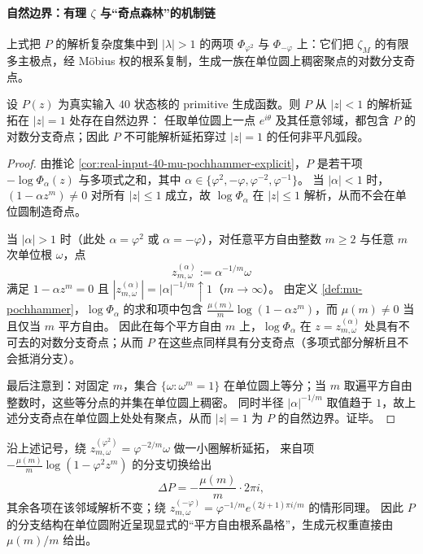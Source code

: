 \paragraph{自然边界：有理 \texorpdfstring{$\zeta$}{zeta} 与“奇点森林”的机制链}
上式把 \(P\) 的解析复杂度集中到 \(|\lambda|>1\) 的两项 \(\Phi_{\varphi^2}\) 与 \(\Phi_{-\varphi}\) 上：它们把 \(\zeta_M\) 的有限多主极点，经 Möbius 权的根系复制，生成一族在单位圆上稠密聚点的对数分支奇点。

\begin{theorem}[单位圆自然边界]\label{thm:primitive-natural-boundary-unit-circle}
设 \(P(z)\) 为真实输入 \(40\) 状态核的 primitive 生成函数。则 \(P\) 从 \(|z|<1\) 的解析延拓在 \(|z|=1\) 处存在自然边界：
任取单位圆上一点 \(e^{i\theta}\) 及其任意邻域，都包含 \(P\) 的对数分支奇点；因此 \(P\) 不可能解析延拓穿过 \(|z|=1\) 的任何非平凡弧段。
\end{theorem}
\begin{proof}
由推论 \ref{cor:real-input-40-mu-pochhammer-explicit}，\(P\) 是若干项 \(-\log\Phi_\alpha(z)\) 与多项式之和，其中 \(\alpha\in\{\varphi^2,-\varphi,\varphi^{-2},\varphi^{-1}\}\)。
当 \(|\alpha|<1\) 时，\((1-\alpha z^m)\neq 0\) 对所有 \(|z|\le 1\) 成立，故 \(\log\Phi_\alpha\) 在 \(|z|\le 1\) 解析，从而不会在单位圆制造奇点。

当 \(|\alpha|>1\) 时（此处 \(\alpha=\varphi^2\) 或 \(\alpha=-\varphi\)），对任意平方自由整数 \(m\ge 2\) 与任意 \(m\) 次单位根 \(\omega\)，点
\[
z_{m,\omega}^{(\alpha)}:=\alpha^{-1/m}\omega
\]
满足 \(1-\alpha z^m=0\) 且 \(|z_{m,\omega}^{(\alpha)}|=|\alpha|^{-1/m}\uparrow 1\)（\(m\to\infty\)）。
由定义 \ref{def:mu-pochhammer}，\(\log\Phi_\alpha\) 的求和项中包含
\(\frac{\mu(m)}{m}\log(1-\alpha z^m)\)，而 \(\mu(m)\neq 0\) 当且仅当 \(m\) 平方自由。
因此在每个平方自由 \(m\) 上，\(\log\Phi_\alpha\) 在 \(z=z_{m,\omega}^{(\alpha)}\) 处具有不可去的对数分支奇点；从而 \(P\) 在这些点同样具有分支奇点（多项式部分解析且不会抵消分支）。

最后注意到：对固定 \(m\)，集合 \(\{\omega:\omega^m=1\}\) 在单位圆上等分；当 \(m\) 取遍平方自由整数时，这些等分点的并集在单位圆上稠密。
同时半径 \(|\alpha|^{-1/m}\) 取值趋于 \(1\)，故上述分支奇点在单位圆上处处有聚点，从而 \(|z|=1\) 为 \(P\) 的自然边界。证毕。
\end{proof}

\begin{remark}\label{rem:primitive-monodromy-mu}
沿上述记号，绕 \(z_{m,\omega}^{(\varphi^2)}=\varphi^{-2/m}\omega\) 做一小圈解析延拓，
来自项 \(-\frac{\mu(m)}{m}\log(1-\varphi^2 z^m)\) 的分支切换给出
\[
\Delta P=-\frac{\mu(m)}{m}\cdot 2\pi i,
\]
其余各项在该邻域解析不变；绕 \(z_{m,\omega}^{(-\varphi)}=\varphi^{-1/m}e^{(2j+1)\pi i/m}\) 的情形同理。
因此 \(P\) 的分支结构在单位圆附近呈现显式的“平方自由根系晶格”，生成元权重直接由 \(\mu(m)/m\) 给出。
\end{remark}

